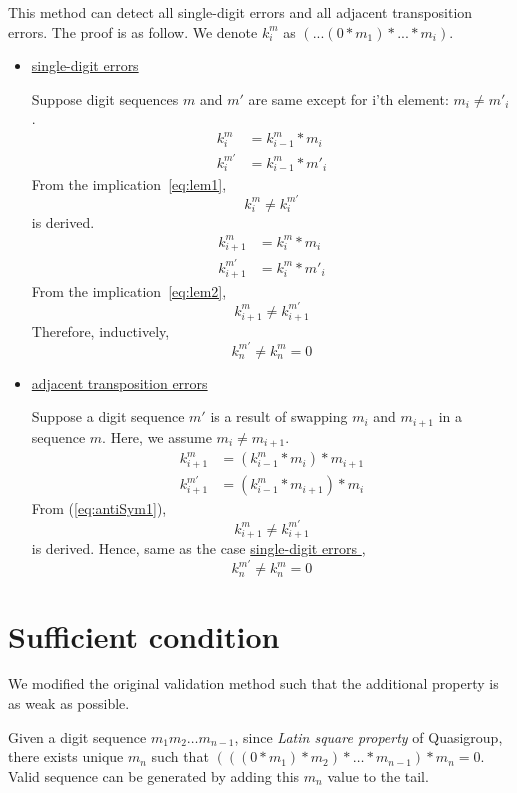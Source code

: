 This method can detect all single-digit
 errors and all adjacent transposition errors.
The proof is as follow.
We denote $k_i^{m}$ as $(...(0*m_1)*...*m_i)$.
\begin{itemize}
 \item \underline{single-digit errors }

       Suppose digit sequences $m$ and $m'$ are same except for i'th element:
       $m_i \neq m'_i$.
       \begin{align*}
	k_i^{m} &= k_{i-1}^{m} * m_i \\
	k_i^{m'} &= k_{i-1}^{m} * m'_i 
       \end{align*}
       From the implication~\ref{eq:lem1},
       $$k_i^{m} \neq k_i^{m'}$$ 
       is derived.
       \begin{align*}
	k_{i+1}^{m} &= k_i^{m} * m_i \\
	k_{i+1}^{m'} &= k_i^{m} * m'_i 
       \end{align*}
       From the implication~\ref{eq:lem2},
       $$k_{i+1}^{m} \neq k_{i+1}^{m'}$$
       Therefore, inductively,
       $$k_{n}^{m'} \neq k_{n}^{m} = 0$$

 \item \underline{ adjacent transposition errors}

       Suppose a digit sequence $m'$ is a result of
       swapping $m_i$ and $m_{i+1}$ in a sequence $m$.
       Here, we assume $m_i \neq m_{i+1}$.
       \begin{align*}
	k_{i+1}^{m} &= (k_{i-1}^{m}* m_i) * m_{i+1} \\
	k_{i+1}^{m'} &= (k_{i-1}^{m}* m_{i+1}) * m_i
       \end{align*}
       From (\ref{eq:antiSym1}),
       $$k_{i+1}^{m} \neq k_{i+1}^{m'}$$ 
       is derived.
       Hence, same as the  case \underline{single-digit errors },
       $$k_{n}^{m'} \neq k_{n}^{m} = 0$$
\end{itemize}

\section{Sufficient condition}
We modified the original validation method such that the additional property is as weak as possible.

Given a digit sequence $m_1 m_2 \ldots m_{n-1}$, since  \emph{ Latin square property} of Quasigroup, there exists unique $m_n$ such that $(((0*m_1)*m_2)*\ldots *m_{n-1}) * m_n = 0$. Valid sequence can be generated by adding this $m_n$ value to the tail.

